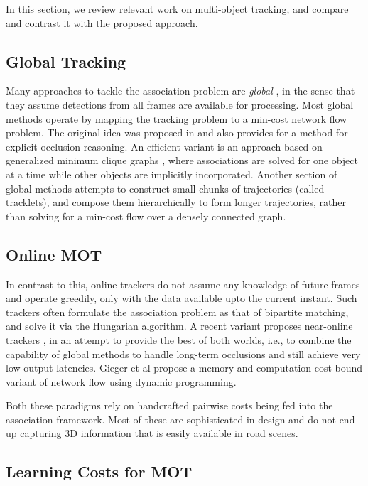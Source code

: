 \documentclass[letterpaper, 10 pt, conference]{ieeeconf}
\begin{document}
In this section, we review relevant work on multi-object tracking, and compare and contrast it with the proposed approach.

\subsection{Global Tracking}

Many approaches to tackle the association problem are \emph{global} \cite{NetFlow2008,gmmcp,everybody,DiscreteContinuous,KSSP,Chari}, in the sense that they assume detections from all frames are available for processing. Most global methods operate by mapping the tracking problem to a min-cost network flow problem. The original idea was proposed in \cite{NetFlow2008} and also provides for a method for explicit occlusion reasoning. An efficient variant is an approach based on generalized minimum clique graphs \cite{gmmcp}, where associations are solved for one object at a time while other objects are implicitly incorporated. Another section of global methods attempts to construct small chunks of trajectories (called tracklets), and compose them hierarchically to form longer trajectories, rather than solving for a min-cost flow over a densely connected graph.

\subsection{Online MOT}

In contrast to this, online trackers \cite{greedyTracker,gool2009,ijcv2017,CIWT} do not assume any knowledge of future frames and operate greedily, only with the data available upto the current instant. Such trackers often formulate the association problem as that of bipartite matching, and solve it via the Hungarian algorithm. A recent variant proposes near-online trackers \cite{NOMT}, in an attempt to provide the best of both worlds, i.e., to combine the capability of global methods to handle long-term occlusions and still achieve very low output latencies. Gieger et al \cite{followme} propose a memory and computation cost bound variant of network flow using dynamic programming.

Both these paradigms rely on handcrafted pairwise costs being fed into the association framework. Most of these are sophisticated in design and do not end up capturing 3D information that is easily available in road scenes.

\subsection{Learning Costs for MOT}
\end{document}
